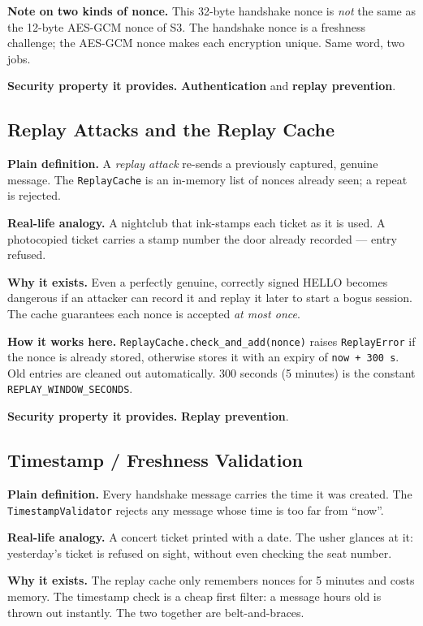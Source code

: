 \documentclass[11pt,a4paper]{article}
\begin{document}
\textbf{Note on two kinds of nonce.} This 32-byte handshake nonce is \emph{not}
the same as the 12-byte AES-GCM nonce of S3. The handshake nonce is a freshness
challenge; the AES-GCM nonce makes each encryption unique. Same word, two jobs.

\textbf{Security property it provides.} \textbf{Authentication} and
\textbf{replay prevention}.

\subsection{Replay Attacks and the Replay Cache}
\textbf{Plain definition.} A \emph{replay attack} re-sends a previously captured,
genuine message. The \texttt{ReplayCache} is an in-memory list of nonces already
seen; a repeat is rejected.

\textbf{Real-life analogy.} A nightclub that ink-stamps each ticket as it is
used. A photocopied ticket carries a stamp number the door already recorded ---
entry refused.

\textbf{Why it exists.} Even a perfectly genuine, correctly signed HELLO becomes
dangerous if an attacker can record it and replay it later to start a bogus
session. The cache guarantees each nonce is accepted \emph{at most once}.

\textbf{How it works here.} \texttt{ReplayCache.check\_and\_add(nonce)} raises
\texttt{ReplayError} if the nonce is already stored, otherwise stores it with an
expiry of \texttt{now + 300\,s}. Old entries are cleaned out automatically. 300
seconds (5 minutes) is the constant \texttt{REPLAY\_WINDOW\_SECONDS}.

\textbf{Security property it provides.} \textbf{Replay prevention}.

\subsection{Timestamp / Freshness Validation}
\textbf{Plain definition.} Every handshake message carries the time it was
created. The \texttt{TimestampValidator} rejects any message whose time is too
far from ``now''.

\textbf{Real-life analogy.} A concert ticket printed with a date. The usher
glances at it: yesterday's ticket is refused on sight, without even checking the
seat number.

\textbf{Why it exists.} The replay cache only remembers nonces for 5 minutes and
costs memory. The timestamp check is a cheap first filter: a message hours old is
thrown out instantly. The two together are belt-and-braces.
\end{document}
